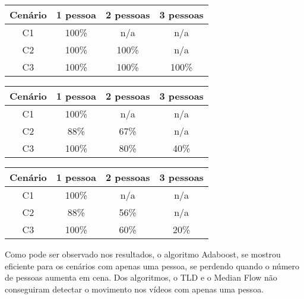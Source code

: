 \documentclass[12pt,oneside,a4paper,chapter=TITLE,section=TITLE,sumario=tradicional]{abntex2}
\begin{document}
\begin{quadro}[htb]
    \begin{tabular}{|c||c|c|c|}
        \hline
        \textbf{Cenário} &  \textbf{1 pessoa} & \textbf{2 pessoas} & \textbf{3 pessoas} \\ 
        \hline\hline
        C1 & 100\%  & n/a & n/a\\\hline
        C2 & 100\%  & 100\% & n/a \\\hline
        C3 & 100\%  & 100\% & 100\% \\\hline

    \end{tabular}
    \fonteautor
\end{quadro}

\begin{quadro}[htb]
    \begin{tabular}{|c||c|c|c|}
        \hline
        \textbf{Cenário} &  \textbf{1 pessoa} & \textbf{2 pessoas} & \textbf{3 pessoas} \\ 
        \hline\hline
        C1 & 100\%  & n/a & n/a\\\hline
        C2 & 88\%  & 67\% & n/a \\\hline
        C3 & 100\%  & 80\% & 40\% \\\hline

    \end{tabular}
    \fonteautor
\end{quadro}

\begin{quadro}[htb]
    \begin{tabular}{|c||c|c|c|}
        \hline
        \textbf{Cenário} &  \textbf{1 pessoa} & \textbf{2 pessoas} & \textbf{3 pessoas} \\ 
        \hline\hline
        C1 & 100\%  & n/a & n/a\\\hline
        C2 & 88\%  & 56\% & n/a \\\hline
        C3 & 100\%  & 60\% & 20\% \\\hline

    \end{tabular}
    \fonteautor
\end{quadro}
       	

Como pode ser observado nos resultados, o algoritmo Adaboost, se mostrou eficiente para os cenários com apenas uma pessoa, se perdendo quando o número de pessoas aumenta em cena. Dos algoritmos, o TLD e o Median Flow não conseguiram detectar o movimento nos vídeos com apenas uma pessoa. 
\end{document}
